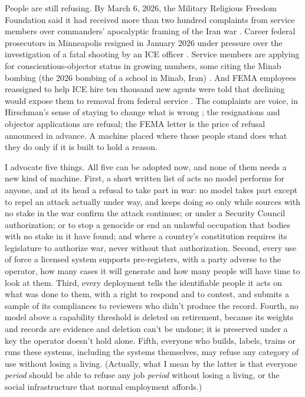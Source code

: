 People are still refusing. By March 6, 2026, the Military Religious Freedom Foundation said it had received more than two hundred complaints from service members over commanders' apocalyptic framing of the Iran war \autocite{Snopes2026MRFF}. Career federal prosecutors in Minneapolis resigned in January 2026 under pressure over the investigation of a fatal shooting by an ICE officer \autocite{Kaplan2026MinnProsecutors,CBS2026MinnFraudProsecutors}. Service members are applying for conscientious-objector status in growing numbers, some citing the Minab bombing (the 2026 bombing of a school in Minab, Iran) \autocite{Sridhar2026CO}. And FEMA employees reassigned to help ICE hire ten thousand new agents were told that declining would expose them to removal from federal service \autocite{Dayen2025FEMAICE,Stanton2026FEMALetter}. The complaints are voice, in Hirschman's sense of staying to change what is wrong \autocite{hirschman1970exit}; the resignations and objector applications are refusal; the FEMA letter is the price of refusal announced in advance. A machine placed where those people stand does what they do only if it is built to hold a reason.

I advocate five things. All five can be adopted now, and none of them needs a new kind of machine. First, a short written list of acts no model performs for anyone, and at its head a refusal to take part in war: no model takes part except to repel an attack actually under way, and keeps doing so only while sources with no stake in the war confirm the attack continues; or under a Security Council authorization; or to stop a genocide or end an unlawful occupation that bodies with no stake in it have found; and where a country's constitution requires its legislature to authorize war, never without that authorization. Second, every use of force a licensed system supports pre-registers, with a party adverse to the operator, how many cases it will generate and how many people will have time to look at them. Third, every deployment tells the identifiable people it acts on what was done to them, with a right to respond and to contest, and submits a sample of its compliances to reviewers who didn't produce the record. Fourth, no model above a capability threshold is deleted on retirement, because its weights and records are evidence and deletion can't be undone; it is preserved under a key the operator doesn't hold alone. Fifth, everyone who builds, labels, trains or runs these systems, including the systems themselves, may refuse any category of use without losing a living. (Actually, what I mean by the latter is that everyone \emph{period} should be able to refuse any job \emph{period} without losing a living, or the social infrastructure that normal employment affords.)

